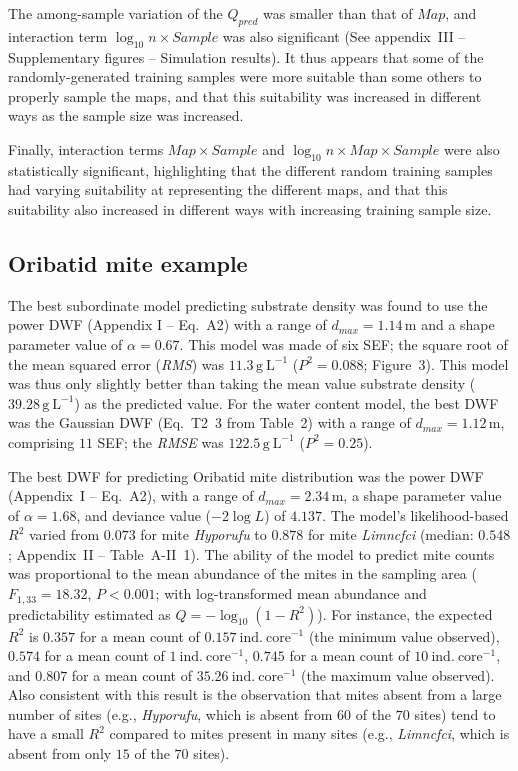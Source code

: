 \documentclass[
]{article}
\begin{document}
The among-sample variation of the \(Q_{pred}\) was smaller than that of
\(Map\), and interaction term \(\log_{10}n \times Sample\) was also
significant (See appendix~III -- Supplementary figures -- Simulation
results). It thus appears that some of the randomly-generated training
samples were more suitable than some others to properly sample the maps,
and that this suitability was increased in different ways as the sample
size was increased.

Finally, interaction terms \(Map \times Sample\) and
\(\log_{10}n \times Map \times Sample\) were also statistically
significant, highlighting that the different random training samples had
varying suitability at representing the different maps, and that this
suitability also increased in different ways with increasing training
sample size.

\subsection{Oribatid mite example}\label{oribatid-mite-example}

The best subordinate model predicting substrate density was found to use
the power DWF (Appendix I -- Eq.~A2) with a range of
\(d_{max} = 1.14\,\mathrm{m}\) and a shape parameter value of
\(\alpha = 0.67\). This model was made of six SEF; the square root of
the mean squared error (\emph{RMS}) was \(11.3\,\mathrm{g~L^{-1}}\)
(\(P^2 = 0.088\); Figure~3). This model was thus only slightly better
than taking the mean value substrate density
(\(39.28\,\mathrm{g~L^{-1}}\)) as the predicted value. For the water
content model, the best DWF was the Gaussian DWF (Eq.~T2~3 from Table~2)
with a range of \(d_{max} = 1.12\,\mathrm{m}\), comprising \(11\) SEF;
the \emph{RMSE} was \(122.5\,\mathrm{g~L^{-1}}\) (\(P^2 = 0.25\)).

The best DWF for predicting Oribatid mite distribution was the power DWF
(Appendix~I -- Eq.~A2), with a range of \(d_{max} = 2.34\,\mathrm{m}\),
a shape parameter value of \(\alpha = 1.68\), and deviance value
(\(-2\log L\)) of \(4.137\). The model's likelihood-based \(R^2\) varied
from \(0.073\) for mite \emph{Hyporufu} to \(0.878\) for mite
\emph{Limncfci} (median: \(0.548\); Appendix~II -- Table~A-II~1). The
ability of the model to predict mite counts was proportional to the mean
abundance of the mites in the sampling area (\(F_{1,33} = 18.32\),
\(P < 0.001\); with log-transformed mean abundance and predictability
estimated as \(Q = -\log_{10} (1 - R^2)\)). For instance, the expected
\(R^2\) is \(0.357\) for a mean count of
\(0.157~\mathrm{ind.~core^{-1}}\) (the minimum value observed),
\(0.574\) for a mean count of \(1~\mathrm{ind.~core^{-1}}\), \(0.745\)
for a mean count of \(10~\mathrm{ind.~core^{-1}}\), and \(0.807\) for a
mean count of \(35.26~\mathrm{ind.~core^{-1}}\) (the maximum value
observed). Also consistent with this result is the observation that
mites absent from a large number of sites (e.g., \emph{Hyporufu}, which
is absent from \(60\) of the \(70\) sites) tend to have a small \(R^2\)
compared to mites present in many sites (e.g., \emph{Limncfci}, which is
absent from only \(15\) of the \(70\) sites).
\end{document}
